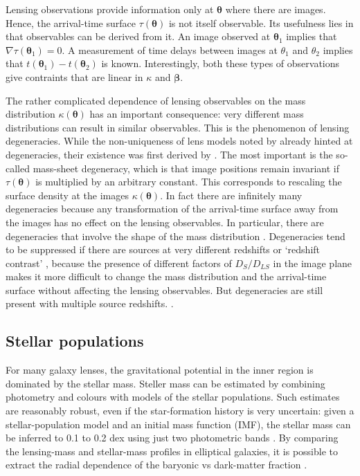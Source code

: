 \documentclass[galley,usenatbib]{mn2e}
\renewcommand{\vec}[1]{\ensuremath{\boldsymbol{#1}}}
\begin{document}
Lensing observations provide information only at $\vec\theta$ where
there are images.  Hence, the arrival-time surface $\tau(\vec\theta)$
is not itself observable.  Its usefulness lies in that observables can
be derived from it.  An image observed at $\vec\theta_1$ implies
that $\nabla\tau(\vec\theta_1)=0$.  A measurement of time delays
between images at $\theta_1$ and $\theta_2$ implies that
$t(\vec\theta_1)-t(\vec\theta_2)$ is known.  Interestingly, both these
types of observations give contraints that are linear in $\kappa$ and
$\vec\beta$.

The rather complicated dependence of lensing observables on the mass
distribution $\kappa(\vec\theta)$ has an important consequence: very different
mass distributions can result in similar observables.  This is the phenomenon
of lensing degeneracies.  While the non-uniqueness of lens models noted by
\cite{1981ApJ...244..736Y} already hinted at degeneracies, their existence was
first derived by \cite{1985ApJ...289L...1F}.  The most important is the
so-called mass-sheet degeneracy, which is that image positions remain invariant
if $\tau(\vec\theta)$ is multiplied by an
arbitrary constant.  This corresponds to rescaling the surface density at the images $\kappa(\vec\theta)$. In fact there are infinitely many degeneracies
\citep{2000AJ....120.1654S} because any transformation of the arrival-time
surface away from the images has no effect on the lensing observables.  In
particular, there are degeneracies that involve the shape of the mass
distribution \citep{2006ApJ...653..936S,2013arXiv1306.4675S}.  Degeneracies
tend to be suppressed if there are sources at very different redshifts or
`redshift contrast' \citep{1998AJ....116.1541A,2009ApJ...690..154S}, because
the presence of different factors of $D_S/D_{LS}$ in the image plane makes it
more difficult to change the mass distribution and the arrival-time surface
without affecting the lensing observables.  But degeneracies are still present
with multiple source redshifts.  \citep{2008MNRAS.386..307L}.

\subsection{Stellar populations} 

For many galaxy lenses, the gravitational potential in the inner
region is dominated by the stellar mass.  Steller mass can be
estimated by combining photometry and colours with models of the
stellar populations.  Such estimates are reasonably robust, even if
the star-formation history is very uncertain: given a
stellar-population model \citep[such as][]{2003MNRAS.344.1000B} and an
initial mass function (IMF), the stellar mass can be inferred to 0.1
to 0.2 dex using just two photometric bands \citep[see e.g., Figure~1
  in][]{2008MNRAS.383..857F}.  By comparing the lensing-mass and
stellar-mass profiles in elliptical galaxies, it is possible to
extract the radial dependence of the baryonic vs dark-matter fraction
\citep{2005ApJ...623L...5F,2008MNRAS.383..857F,2011ApJ...740...97L}.
\end{document}

